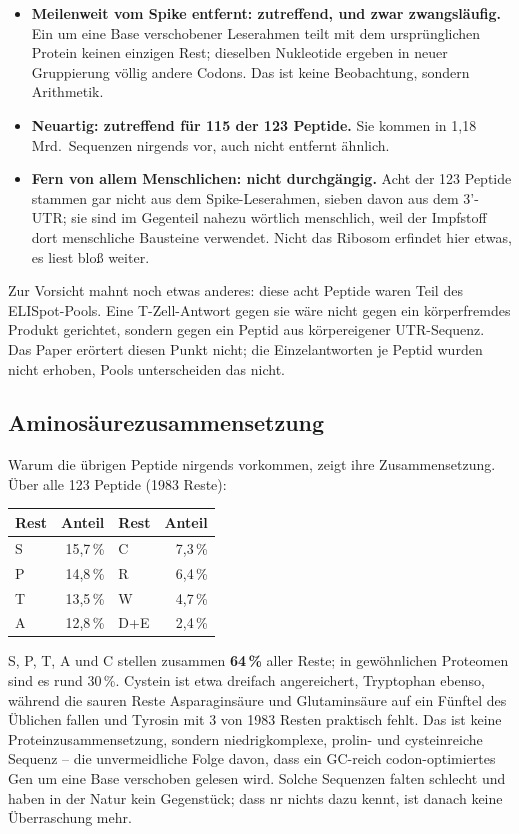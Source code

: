 \documentclass[11pt,a4paper]{article}
\begin{document}
\begin{itemize}
\item \textbf{Meilenweit vom Spike entfernt: zutreffend, und zwar zwangsläufig.}
      Ein um eine Base verschobener Leserahmen teilt mit dem ursprünglichen
      Protein keinen einzigen Rest; dieselben Nukleotide ergeben in neuer
      Gruppierung völlig andere Codons. Das ist keine Beobachtung, sondern
      Arithmetik.
\item \textbf{Neuartig: zutreffend für 115 der 123 Peptide.} Sie kommen in
      1,18\,Mrd.\ Sequenzen nirgends vor, auch nicht entfernt ähnlich.
\item \textbf{Fern von allem Menschlichen: nicht durchgängig.} Acht der 123
      Peptide stammen gar nicht aus dem Spike-Leserahmen, sieben davon aus dem
      3'-UTR; sie sind im Gegenteil nahezu wörtlich menschlich, weil der
      Impfstoff dort menschliche Bausteine verwendet. Nicht das Ribosom
      erfindet hier etwas, es liest bloß weiter.
\end{itemize}

Zur Vorsicht mahnt noch etwas anderes: diese acht Peptide waren Teil des
ELISpot-Pools. Eine T-Zell-Antwort gegen sie wäre nicht gegen ein
körperfremdes Produkt gerichtet, sondern gegen ein Peptid aus körpereigener
UTR-Sequenz. Das Paper erörtert diesen Punkt nicht; die Einzelantworten je
Peptid wurden nicht erhoben, Pools unterscheiden das nicht.

\subsection{Aminosäurezusammensetzung}

Warum die übrigen Peptide nirgends vorkommen, zeigt ihre Zusammensetzung. Über
alle 123 Peptide (1983 Reste):

\begin{center}
\begin{tabular}{lrlr}
\toprule
Rest & Anteil & Rest & Anteil \\
\midrule
S & 15{,}7\,\% & C & 7{,}3\,\% \\
P & 14{,}8\,\% & R & 6{,}4\,\% \\
T & 13{,}5\,\% & W & 4{,}7\,\% \\
A & 12{,}8\,\% & D+E & 2{,}4\,\% \\
\bottomrule
\end{tabular}
\end{center}

S, P, T, A und C stellen zusammen \textbf{64\,\%} aller Reste; in gewöhnlichen
Proteomen sind es rund 30\,\%. Cystein ist etwa dreifach angereichert,
Tryptophan ebenso, während die sauren Reste Asparaginsäure und Glutaminsäure
auf ein Fünftel des Üblichen fallen und Tyrosin mit 3 von 1983 Resten praktisch
fehlt. Das ist keine Proteinzusammensetzung, sondern niedrigkomplexe,
prolin- und cysteinreiche Sequenz -- die unvermeidliche Folge davon, dass ein
GC-reich codon-optimiertes Gen um eine Base verschoben gelesen wird. Solche
Sequenzen falten schlecht und haben in der Natur kein Gegenstück; dass nr
nichts dazu kennt, ist danach keine Überraschung mehr.
\end{document}
